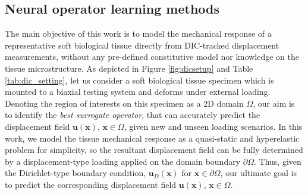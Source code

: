 \documentclass[twocolumn,10pt]{asme2ej}
\renewcommand{\~}{\tilde}
\renewcommand{\-}{\bar}
\newcommand{\8}{\infty}
\numberwithin{equation}{section}
\def\omg{{\Omega}}
\def \ub{\bm{u}}
\def \xb{\bm{x}}
\begin{document}



\subsection{Neural operator learning methods}

The main objective of this work is to model the mechanical response of a representative soft biological tissue directly from DIC-tracked displacement measurements, without any pre-defined constitutive model nor knowledge on the tissue microstructure. As depicted in Figure \ref{fig:dicsetup} and Table \ref{tab:dic_setting}, let us consider a soft biological tissue specimen which is mounted to a biaxial testing system and deforms under external loading. Denoting the region of interests on this specimen as a 2D domain $\Omega$, our aim is to identify the {\it best surrogate operator}, that can accurately predict the displacement field $\ub(\xb)$, $\xb\in\omg$, given new and unseen loading scenarios. In this work, we model the tissue mechanical response as a quasi-static and hyperelastic problem for simplicity, so the resultant displacement field can be fully determined by a displacement-type loading applied on the domain boundary $\partial \Omega$. Thus, given the Dirichlet-type boundary condition, $\ub_D(\xb)$ for $\xb\in\partial\Omega$, our ultimate goal is to predict the corresponding displacement field $\ub(\xb)$, $\xb\in\omg$. 
\end{document}
